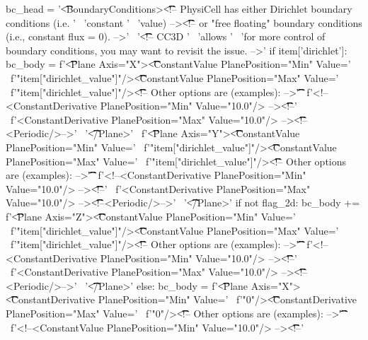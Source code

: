 \begin{python}
        bc_head = '\t\t\t<BoundaryConditions>\n\t\t\t\t<!-- PhysiCell has either Dirichlet boundary conditions (i.e. ' \
                  'constant ' \
                  'value) -->\n\t\t\t\t<!-- or "free floating" boundary conditions (i.e., constant flux = 0). -->' \
                  '\n\t\t\t\t<!-- CC3D ' \
                  'allows ' \
                  'for more control of boundary conditions, you may want to revisit the issue. -->\n'
        if item['dirichlet']:
            bc_body = f'\t\t\t\t<Plane Axis="X">\n\t\t\t\t\t<ConstantValue PlanePosition="Min" Value=' \
                      f'"{item["dirichlet_value"]}"/>\n\t\t\t\t\t<ConstantValue PlanePosition="Max" Value=' \
                      f'"{item["dirichlet_value"]}"/>\n\t\t\t\t\t<!-- Other options are (examples): -->\n\t\t\t\t\t' \
                      f'<!--<ConstantDerivative PlanePosition="Min" Value="10.0"/> -->\n\t\t\t\t\t<!--' \
                      f'<ConstantDerivative PlanePosition="Max" Value="10.0"/> -->\n\t\t\t\t\t<!--<Periodic/>-->' \
                      '\t\t\t\t</Plane>\n' \
                      f'\t\t\t\t<Plane Axis="Y">\n\t\t\t\t\t<ConstantValue PlanePosition="Min" Value=' \
                      f'"{item["dirichlet_value"]}"/>\n\t\t\t\t\t<ConstantValue PlanePosition="Max" Value=' \
                      f'"{item["dirichlet_value"]}"/>\n\t\t\t\t\t<!-- Other options are (examples): -->\n\t\t\t\t\t' \
                      f'<!--<ConstantDerivative PlanePosition="Min" Value="10.0"/> -->\n\t\t\t\t\t<!--' \
                      f'<ConstantDerivative PlanePosition="Max" Value="10.0"/> -->\n\t\t\t\t\t<!--<Periodic/>-->' \
                      '\n\t\t\t\t</Plane>\n'
            if not flag_2d:
                bc_body += f'\t\t\t\t<Plane Axis="Z">\n\t\t\t\t\t<ConstantValue PlanePosition="Min" Value=' \
                   f'"{item["dirichlet_value"]}"/>\n\t\t\t\t\t<ConstantValue PlanePosition="Max" Value=' \
                   f'"{item["dirichlet_value"]}"/>\n\t\t\t\t\t<!-- Other options are (examples): -->\n\t\t\t\t\t' \
                   f'<!--<ConstantDerivative PlanePosition="Min" Value="10.0"/> -->\n\t\t\t\t\t<!--' \
                   f'<ConstantDerivative PlanePosition="Max" Value="10.0"/> -->\n\t\t\t\t\t<!--<Periodic/>-->' \
                           '\n\t\t\t\t</Plane>\n'
        else:
            bc_body = f'\t\t\t\t<Plane Axis="X">\n\t\t\t\t\t<ConstantDerivative PlanePosition="Min" Value=' \
              f'"0"/>\n\t\t\t\t\t<ConstantDerivative PlanePosition="Max" Value=' \
              f'"0"/>\n\t\t\t\t\t<!-- Other options are (examples): -->\n\t\t\t\t\t' \
              f'<!--<ConstantValue PlanePosition="Min" Value="10.0"/> -->\n\t\t\t\t\t<!--' \

\end{python}
